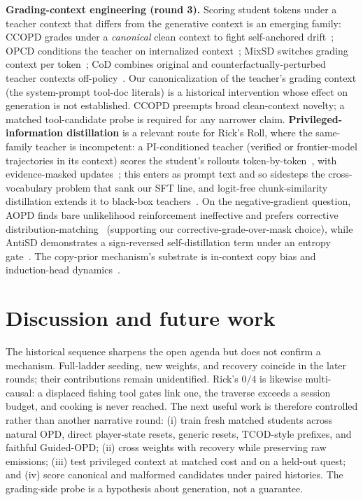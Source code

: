 \documentclass[11pt]{article}
\begin{document}
\textbf{Grading-context engineering (round 3).} Scoring student tokens under a teacher context
that differs from the generative context is an emerging family: CCOPD grades under a
\emph{canonical} clean context to fight self-anchored drift~\cite{ccopd}; OPCD conditions the
teacher on internalized context~\cite{opcd}; MixSD switches grading context per token~\cite{mixsd};
CoD combines original and counterfactually-perturbed teacher contexts off-policy~\cite{cod}. Our
canonicalization of the teacher's grading context (the system-prompt tool-doc literals) is a
historical intervention whose effect on generation is not established. CCOPD preempts broad
clean-context novelty; a matched tool-candidate probe is required for any narrower claim.
\textbf{Privileged-information distillation} is a relevant route for Rick's Roll, where
the same-family teacher is incompetent: a PI-conditioned teacher (verified or frontier-model
trajectories in its context) scores the student's rollouts token-by-token~\cite{pidistill,opsd},
with evidence-masked updates~\cite{edgeopd}; this enters as prompt text and so sidesteps the
cross-vocabulary problem that sank our SFT line, and logit-free chunk-similarity distillation
extends it to black-box teachers~\cite{omniopd}. On the negative-gradient question, AOPD finds bare
unlikelihood reinforcement ineffective and prefers corrective distribution-matching~\cite{aopd}
(supporting our corrective-grade-over-mask choice), while AntiSD demonstrates a sign-reversed
self-distillation term under an entropy gate~\cite{antisd}. The copy-prior mechanism's substrate
is in-context copy bias and induction-head dynamics~\cite{copybias,repetitioncurse}.

\section{Discussion and future work}
The historical sequence sharpens the open agenda but does not confirm a mechanism. Full-ladder
seeding, new weights, and recovery coincide in the later rounds; their contributions remain
unidentified. Rick's $0/4$ is likewise multi-causal: a displaced fishing tool gates link one,
the traverse exceeds a session budget, and cooking is never reached. The next useful work is
therefore controlled rather than another narrative round: (i) train fresh matched students across
natural OPD, direct player-state resets, generic resets, TCOD-style prefixes, and faithful
Guided-OPD; (ii) cross weights with recovery while preserving raw emissions; (iii) test privileged
context at matched cost and on a held-out quest; and (iv) score canonical and malformed candidates
under paired histories. The grading-side probe is a hypothesis about generation, not a guarantee.
\end{document}
